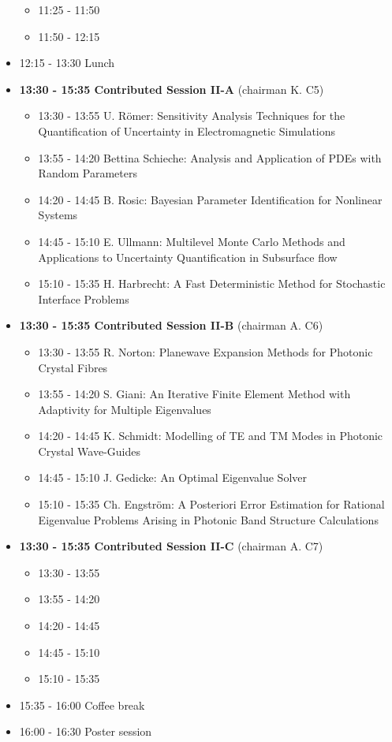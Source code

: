 \documentclass[10pt, A4]{article}%
\begin{document}
\begin{itemize}
\begin{itemize}
    \item 11:25 - 11:50 
    \item 11:50 - 12:15
  \end{itemize}
  \item 12:15 - 13:30 Lunch
  \item {\bf 13:30 - 15:35 Contributed Session II-A} (chairman K. C5) 
  \begin{itemize}
    \item 13:30 - 13:55 U. R\"{o}mer: Sensitivity Analysis Techniques for the Quantification of Uncertainty in Electromagnetic Simulations
    \item 13:55 - 14:20 Bettina Schieche: Analysis and Application of PDEs with Random Parameters
    \item 14:20 - 14:45 B. Rosic: Bayesian Parameter Identification for Nonlinear Systems
    \item 14:45 - 15:10 E. Ullmann: Multilevel Monte Carlo Methods and Applications to Uncertainty Quantification in Subsurface flow
    \item 15:10 - 15:35 H. Harbrecht: A Fast Deterministic Method for Stochastic Interface Problems
  \end{itemize}
  \item {\bf 13:30 - 15:35 Contributed Session II-B} (chairman A. C6) 
  \begin{itemize}
    \item 13:30 - 13:55 R. Norton: Planewave Expansion Methods for Photonic Crystal Fibres
    \item 13:55 - 14:20 S. Giani: An Iterative Finite Element Method with Adaptivity for Multiple Eigenvalues
    \item 14:20 - 14:45 K. Schmidt: Modelling of TE and TM Modes in Photonic Crystal Wave-Guides
    \item 14:45 - 15:10 J. Gedicke: An Optimal Eigenvalue Solver
    \item 15:10 - 15:35 Ch. Engstr\"{o}m: A Posteriori Error Estimation for Rational Eigenvalue Problems Arising in Photonic Band Structure Calculations
  \end{itemize}
    \item {\bf 13:30 - 15:35 Contributed Session II-C} (chairman A. C7) 
  \begin{itemize}
    \item 13:30 - 13:55 
    \item 13:55 - 14:20 
    \item 14:20 - 14:45 
    \item 14:45 - 15:10 
    \item 15:10 - 15:35 
  \end{itemize}
  \item 15:35 - 16:00 Coffee break
  \item 16:00 - 16:30 Poster session
\end{itemize}
\end{document}
